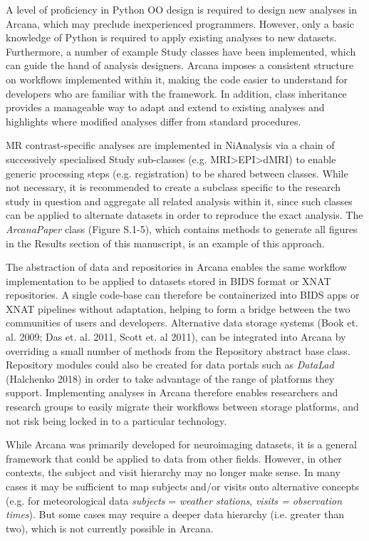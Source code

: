 A level of proficiency in Python OO design is required to design new
analyses in Arcana, which may preclude inexperienced programmers.
However, only a basic knowledge of Python is required to apply existing
analyses to new datasets. Furthermore, a number of example Study classes
have been implemented, which can guide the hand of analysis designers.
Arcana imposes a consistent structure on workflows implemented within
it, making the code easier to understand for developers who are familiar
with the framework. In addition, class inheritance provides a manageable
way to adapt and extend to existing analyses and highlights where
modified analyses differ from standard procedures.

MR contrast-specific analyses are implemented in NiAnalysis via a chain
of successively specialised Study sub-classes (e.g.
MRI\textgreater{}EPI\textgreater{}dMRI) to enable generic processing
steps (e.g. registration) to be shared between classes. While not
necessary, it is recommended to create a subclass specific to the
research study in question and aggregate all related analysis within it,
since such classes can be applied to alternate datasets in order to
reproduce the exact analysis. The \emph{ArcanaPaper} class (Figure
S.1-5), which contains methods to generate all figures in the Results
section of this manuscript, is an example of this approach.

The abstraction of data and repositories in Arcana enables the same
workflow implementation to be applied to datasets stored in BIDS format
or XNAT repositories. A single code-base can therefore be containerized
into BIDS apps or XNAT pipelines without adaptation, helping to form a
bridge between the two communities of users and developers. Alternative
data storage systems (Book et. al. 2009; Das et. al. 2011, Scott et. al
2011), can be integrated into Arcana by overriding a small number of
methods from the Repository abstract base class. Repository modules
could also be created for data portals such as \emph{DataLad} (Halchenko
2018) in order to take advantage of the range of platforms they support.
Implementing analyses in Arcana therefore enables researchers and
research groups to easily migrate their workflows between storage
platforms, and not risk being locked in to a particular technology.

While Arcana was primarily developed for neuroimaging datasets, it is a
general framework that could be applied to data from other fields.
However, in other contexts, the subject and visit hierarchy may no
longer make sense. In many cases it may be sufficient to map subjects
and/or visits onto alternative concepts (e.g. for meteorological data
\emph{subjects} = \emph{weather stations}, \emph{visits = observation
times}). But some cases may require a deeper data hierarchy (i.e.
greater than two), which is not currently possible in Arcana.

